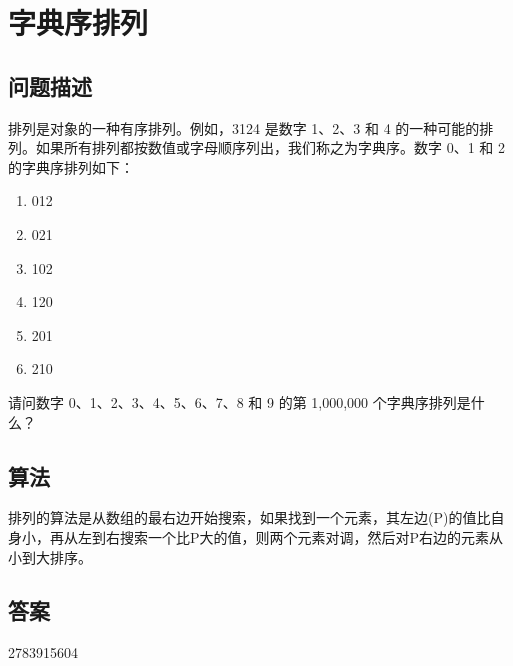 \section{字典序排列}\label{sec:problem24}
\subsection{问题描述}
\begin{tcolorbox}
排列是对象的一种有序排列。例如，3124 是数字 1、2、3 和 4 的一种可能的排列。如果所有排列都按数值或字母顺序列出，我们称之为字典序。数字 0、1 和 2 的字典序排列如下：

\begin{enumerate}
  \item 012
  \item 021
  \item 102
  \item 120
  \item 201
  \item 210
\end{enumerate}

请问数字 0、1、2、3、4、5、6、7、8 和 9 的第 1,000,000 个字典序排列是什么？
\end{tcolorbox}

\subsection{算法}
排列的算法是从数组的最右边开始搜索，如果找到一个元素，其左边(P)的值比自身小，再从左到右搜索一个比P大的值，则两个元素对调，然后对P右边的元素从小到大排序。

\subsection{答案}
2783915604
